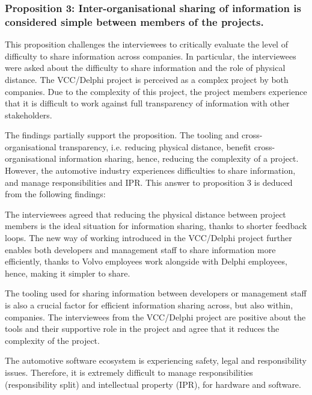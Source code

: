 \subsubsection{Proposition 3: Inter-organisational sharing of information is considered simple between members of the projects.}

This proposition challenges the interviewees to critically evaluate the level of difficulty to share information across companies. In particular, the interviewees were asked about the difficulty to share information and the role of physical distance. The VCC/Delphi project is perceived as a complex project by both companies. Due to the complexity of this project, the project members experience that it is difficult to work against full transparency of information with other stakeholders. 

The findings partially support the proposition. The tooling and cross-organisational transparency, i.e. reducing physical distance, benefit cross-organisational information sharing, hence, reducing the complexity of a project. However, the automotive industry experiences difficulties to share information, and manage responsibilities and IPR. This answer to proposition 3 is deduced from the following findings:

 The interviewees agreed that reducing the physical distance between project members is the ideal situation for information sharing, thanks to shorter feedback loops. The new way of working introduced in the VCC/Delphi project further enables both developers and management staff to share information more efficiently, thanks to Volvo employees work alongside with Delphi employees, hence, making it simpler to share. 

 The tooling used for sharing information between developers or management staff is also a crucial factor for efficient information sharing across, but also within, companies. The interviewees from the VCC/Delphi project are positive about the tools and their supportive role in the project and agree that it reduces the complexity of the project.

 The automotive software ecosystem is experiencing safety, legal and responsibility issues. Therefore, it is extremely difficult to manage responsibilities (responsibility split) and intellectual property (IPR), for hardware and software. %

